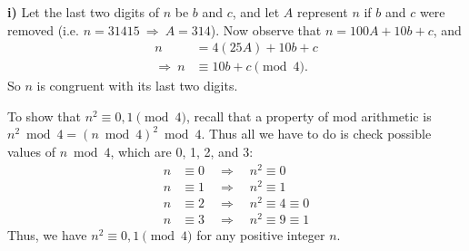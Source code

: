 \begin{solution}
        \textbf{i)} Let the last two digits of $n$ be $b$ and $c$, and let $A$ represent $n$ if $b$ and $c$ were removed (i.e. $n=31415 \ \Rightarrow \ A=314$). Now observe that $n=100A+10b+c$, and
        \begin{align*}
            n &= 4(25A) +10b + c\\
            \Rightarrow \ n &\equiv 10b + c \pmod 4.
        \end{align*}
        So $n$ is congruent with its last two digits.

        To show that $n^2 \equiv 0,1 \pmod 4$, recall that a property of mod arithmetic is $n^2 \bmod 4 = (n \bmod 4)^2 \bmod 4$. Thus all we have to do is check possible values of $n \bmod 4$, which are 0, 1, 2, and 3:
        \begin{align*}
            n &\equiv 0 \quad \Rightarrow \quad n^2 \equiv 0\\
            n &\equiv 1 \quad \Rightarrow \quad n^2 \equiv 1\\
            n &\equiv 2 \quad \Rightarrow \quad n^2 \equiv 4 \equiv 0\\
            n &\equiv 3 \quad \Rightarrow \quad n^2 \equiv 9 \equiv 1
        \end{align*}
        Thus, we have $n^2 \equiv 0,1 \pmod 4$ for any positive integer  $n$.


\end{solution}
